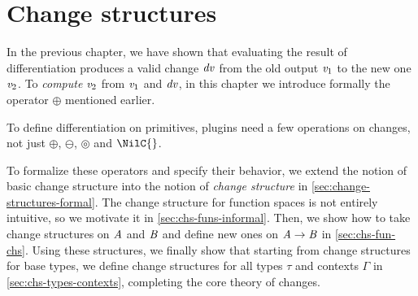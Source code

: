 









\def\deriveDefCore{%
\begin{align*}
  \ensuremath{\Derive{\lambda (\Varid{x}\typcolon\sigma)\to \Varid{t}}} &= \ensuremath{\lambda (\Varid{x}\typcolon\sigma)\;(\Varid{dx}\typcolon\Delta \sigma)\to \Derive{\Varid{t}}} \\
  \ensuremath{\Derive{\Varid{s}\;\Varid{t}}} &= \ensuremath{\Derive{\Varid{s}}\;\Varid{t}\;\Derive{\Varid{t}}} \\
  \ensuremath{\Derive{\Varid{x}}} &= \ensuremath{\Varid{dx}} \\
  \ensuremath{\Derive{\Varid{c}}} &= \ensuremath{\DeriveConst{\Varid{c}}}
\end{align*}
}




\chapter{Change structures}
\label{ch:change-theory}
In the previous chapter, we have shown that evaluating the result
of differentiation produces a valid change \ensuremath{\Varid{dv}} from the old
output \ensuremath{\Varid{v}_{1}} to the new one \ensuremath{\Varid{v}_{2}}.
%
To \emph{compute} \ensuremath{\Varid{v}_{2}} from \ensuremath{\Varid{v}_{1}} and \ensuremath{\Varid{dv}}, in this chapter we
introduce formally the operator \ensuremath{\oplus } mentioned earlier.

To define differentiation on primitives, plugins need a few operations on
changes,
not just \ensuremath{\oplus }, \ensuremath{\ominus }, \ensuremath{\circledcirc } and \ensuremath{\NilC{}}.

To formalize these operators and specify their behavior, we extend the notion of
basic change structure into the notion of \emph{change structure} in
\cref{sec:change-structures-formal}.
The change structure for function spaces is not entirely intuitive, so we
motivate it in \cref{sec:chs-funs-informal}.
Then, we show how to take change structures on \ensuremath{\Conid{A}} and \ensuremath{\Conid{B}} and
define new ones on \ensuremath{\Conid{A}\to \Conid{B}} in \cref{sec:chs-fun-chs}. Using
these structures, we finally show that starting from change
structures for base types, we define change structures for
all types \ensuremath{\tau} and contexts \ensuremath{\Gamma} in \cref{sec:chs-types-contexts},
completing the core theory of changes.

